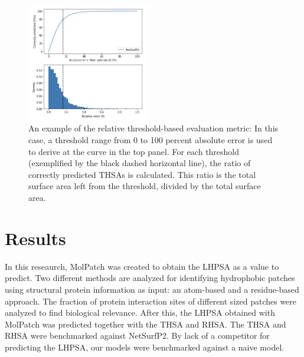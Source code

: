 \documentclass[11pt,a4paper]{article}
\begin{document}
\begin{figure}[h!]
  \centering
  \includegraphics[width=0.48\textwidth]{figures/relerrorthres.png}
  \caption{An example of the relative threshold-based evaluation metric: In this case, a threshold range from 0 to 100 percent absolute error is used to derive at the curve in the top panel. For each threshold (exemplified by the black dashed horizontal line), the ratio of correctly predicted THSAs is calculated. This ratio is the total surface area left from the threshold, divided by the total surface area.}
  \label{fig5}
\end{figure}

\section{Results}
In this reseaurch, MolPatch was created to obtain the LHPSA as a value to predict. Two different methods are analyzed for identifying hydrophobic patches using structural protein information as input: an atom-based and a residue-based approach. The fraction of protein interaction sites of different sized patches were analyzed to find biological relevance. After this, the LHPSA obtained with MolPatch was predicted together with the THSA and RHSA. The THSA and RHSA were benchmarked against NetSurfP2. By lack of a competitor for predicting the LHPSA, our models were benchmarked against a naive model. 
\end{document}
